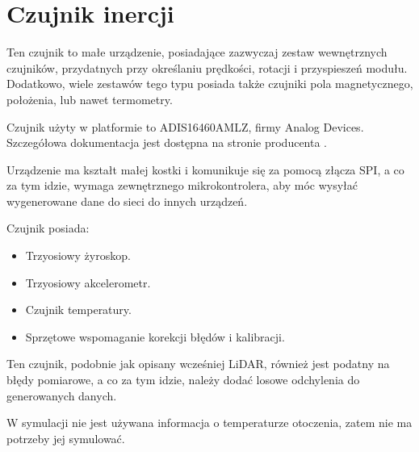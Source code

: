\section{Czujnik inercji}
	Ten czujnik to małe urządzenie, posiadające zazwyczaj zestaw wewnętrznych czujników, przydatnych przy określaniu prędkości, rotacji i przyspieszeń modułu.
	Dodatkowo, wiele zestawów tego typu posiada także czujniki pola magnetycznego, położenia, lub nawet termometry.
	
	Czujnik użyty w platformie to ADIS16460AMLZ, firmy Analog Devices. Szczegółowa dokumentacja jest dostępna na stronie producenta \cite{adis_website}.
	
	Urządzenie ma kształt małej kostki i komunikuje się za pomocą złącza SPI, a co za tym idzie, wymaga zewnętrznego mikrokontrolera, aby móc wysyłać wygenerowane dane
	do sieci do innych urządzeń.
	
	Czujnik posiada:
	\begin{itemize}
		\item Trzyosiowy żyroskop.
		\item Trzyosiowy akcelerometr.
		\item Czujnik temperatury.
		\item Sprzętowe wspomaganie korekcji błędów i kalibracji.
	\end{itemize}
	
	Ten czujnik, podobnie jak opisany wcześniej LiDAR, również jest podatny na błędy pomiarowe, a co za tym idzie, należy dodać losowe odchylenia do generowanych danych.
	
	W symulacji nie jest używana informacja o temperaturze otoczenia, zatem nie ma potrzeby jej symulować.
